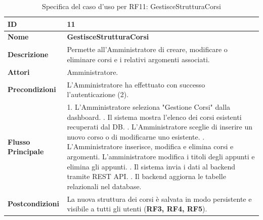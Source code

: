 \begin{table}[H]
    \small
    \caption{Specifica del caso d'uso per RF11: GestisceStrutturaCorsi}
    \label{tab:spec_uc11}
    \begin{tabularx}{\textwidth}{@{}l X@{}}
        \toprule
        \textbf{ID} & 11 \\
        \midrule
        \textbf{Nome} & \textbf{GestisceStrutturaCorsi} \\
        \midrule
        \textbf{Descrizione} & Permette all'Amministratore di creare, modificare o eliminare corsi e i relativi argomenti associati. \\
        \midrule
        \textbf{Attori} & Amministratore. \\
        \midrule
        \textbf{Precondizioni} & L'Amministratore ha effettuato con successo l'autenticazione (2). \\
        \midrule
        \textbf{Flusso Principale} & 
        1. L'Amministratore seleziona "Gestione Corsi" dalla dashboard. \newline
        2. Il sistema mostra l'elenco dei corsi esistenti recuperati dal DB. \newline
        3. L'Amministratore sceglie di inserire un nuovo corso o di modificarne uno esistente. \newline
        4. L'Amministratore inserisce, modifica e elimina corsi e argomenti. L'amministratore modifica i titoli degli appunti e elimina gli appunti. \newline
        5. Il sistema invia i dati al backend tramite REST API. \newline
        6. Il backend aggiorna le tabelle relazionali nel database. \\
        \midrule
        \textbf{Postcondizioni} & La nuova struttura dei corsi è salvata in modo persistente e visibile a tutti gli utenti (\textbf{RF3, RF4, RF5}). \\
        \bottomrule
    \end{tabularx}
\end{table}

\newpage
